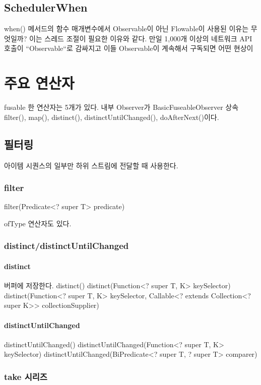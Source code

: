 \documentclass{book}
\begin{document}
{\section{SchedulerWhen}
when() 메서드의 함수 매개변수에서 Observable이 아닌 Flowable이 사용된 이유는 무엇일까? 이는 스레드 조절이 필요한 이유와 같다. 만일 1,000개 이상의 네트워크 API 호출이 ``Observable``로 감싸지고 이들 Observable이 계속해서 구독되면 어떤 현상이 


\chapter{주요 연산자}

fusable 한 연산자는 5개가 있다.
내부 Observer가 BasicFuseableObserver 상속
filter(), map(), distinct(), distinctUntilChanged(), doAfterNext()이다.

\section{필터링}
아이템 시퀀스의 일부만 하위 스트림에 전달할 때 사용한다.
\subsection{filter}
filter(Predicate<? super T> predicate)

ofType 연산자도 있다.

\subsection{distinct/distinctUntilChanged}
\subsubsection{distinct}
버퍼에 저장한다.
distinct()
distinct(Function<? super T, K> keySelector)
distinct(Function<? super T, K> keySelector, Callable<? extends Collection<? super K>> collectionSupplier)

\subsubsection{distinctUntilChanged}
distinctUntilChanged()
distinctUntilChanged(Function<? super T, K> keySelector)
distinctUntilChanged(BiPredicate<? super T, ? super T> comparer)

\subsection{take 시리즈}

}
\end{document}
